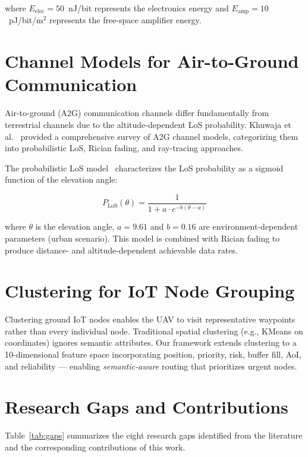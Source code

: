 \documentclass[12pt, a4paper, oneside]{report}
\begin{document}
where $E_{\text{elec}} = 50$~nJ/bit represents the electronics energy and $E_{\text{amp}} = 10$~pJ/bit/m$^2$ represents the free-space amplifier energy.

\section{Channel Models for Air-to-Ground Communication}

Air-to-ground (A2G) communication channels differ fundamentally from terrestrial channels due to the altitude-dependent LoS probability. Khuwaja et al.~\cite{khuwaja2018survey} provided a comprehensive survey of A2G channel models, categorizing them into probabilistic LoS, Rician fading, and ray-tracing approaches.

The probabilistic LoS model~\cite{al2014los} characterizes the LoS probability as a sigmoid function of the elevation angle:

\begin{equation}
P_{\text{LoS}}(\theta) = \frac{1}{1 + a \cdot e^{-b(\theta - a)}}
\label{eq:plos_lit}
\end{equation}

where $\theta$ is the elevation angle, $a = 9.61$ and $b = 0.16$ are environment-dependent parameters (urban scenario). This model is combined with Rician fading to produce distance- and altitude-dependent achievable data rates.

\section{Clustering for IoT Node Grouping}

Clustering ground IoT nodes enables the UAV to visit representative waypoints rather than every individual node. Traditional spatial clustering (e.g., KMeans on coordinates) ignores semantic attributes. Our framework extends clustering to a 10-dimensional feature space incorporating position, priority, risk, buffer fill, AoI, and reliability --- enabling \textit{semantic-aware} routing that prioritizes urgent nodes.

\section{Research Gaps and Contributions}

Table~\ref{tab:gaps} summarizes the eight research gaps identified from the literature and the corresponding contributions of this work.
\end{document}
